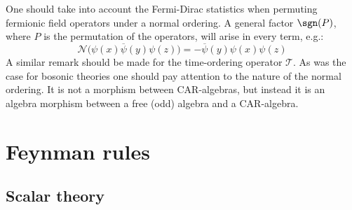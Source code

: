 
    \begin{remark}
        One should take into account the Fermi-Dirac statistics when permuting fermionic field operators under a normal ordering. A general factor $\sgn(P)$, where $P$ is the permutation of the operators, will arise in every term, e.g.: \[\mathcal{N}\Big(\psi(x)\overline\psi(y)\psi(z)\Big) = -\overline\psi(y)\psi(x)\psi(z)\] A similar remark should be made for the time-ordering operator $\mathcal{T}$. As was the case for bosonic theories one should pay attention to the nature of the normal ordering. It is not a morphism between CAR-algebras, but instead it is an algebra morphism between a free (odd) algebra and a CAR-algebra.
    \end{remark}

\section{Feynman rules}
\subsection{Scalar theory}

